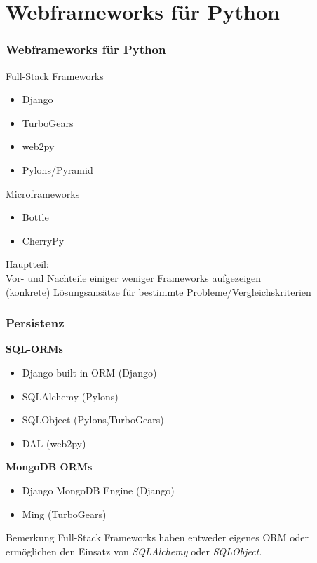 \documentclass[
    t,
    smaller,
    compress,
]{beamer}
\begin{document}
\section{Webframeworks für Python}
\begin{frame}
  \frametitle{Webframeworks für Python}
  	 Full-Stack Frameworks
  		\begin{itemize}[<1->]
  			\item Django
  			\item TurboGears 
  			\item web2py
  			\item Pylons/Pyramid
  		\end{itemize}
  		 Microframeworks
  		\begin{itemize}[<1->]
  			\item Bottle
  			\item CherryPy
  		\end{itemize}
  
\end{frame}


\begin{frame}
Hauptteil:\\
Vor- und Nachteile einiger weniger Frameworks aufgezeigen\\
(konkrete) Lösungsansätze für bestimmte Probleme/Vergleichskriterien
\end{frame}


\begin{frame}
  \frametitle{Persistenz}
 
    \textbf{SQL-ORMs}
    \begin{itemize}[<1->]
        \item Django built-in ORM (Django)
        \item SQLAlchemy (Pylons) %
        \item SQLObject (Pylons,TurboGears)
        \item DAL (web2py)
     \end{itemize}
     \textbf{MongoDB ORMs}
    \begin{itemize}[<1->]
        \item Django MongoDB Engine (Django)
        \item Ming (TurboGears)
    \end{itemize}
 
  \begin{block}{Bemerkung}
     Full-Stack Frameworks haben entweder eigenes ORM 	oder ermöglichen den Einsatz von \textit{SQLAlchemy} oder \textit{SQLObject}.
  \end{block}

\end{frame}
\end{document}
